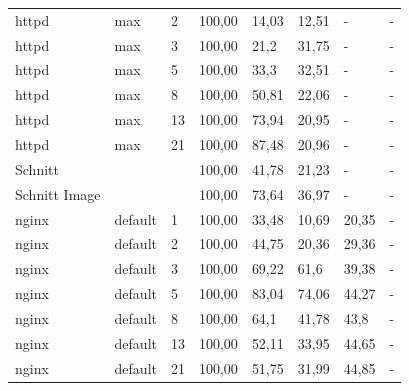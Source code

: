 \begin{footnotesize}
\begin{longtable}{llllllll}
		httpd          & max     & 2          & 100,00 & 14,03                       & 12,51                          & -      & -      \\
		httpd          & max     & 3          & 100,00 & 21,2                        & 31,75                          & -      & -      \\
		httpd          & max     & 5          & 100,00 & 33,3                        & 32,51                          & -      & -      \\
		httpd          & max     & 8          & 100,00 & 50,81                       & 22,06                          & -      & -      \\
		httpd          & max     & 13         & 100,00 & 73,94                       & 20,95                          & -      & -      \\
		httpd          & max     & 21         & 100,00 & 87,48                       & 20,96                          & -      & -      \\ \hline
		Schnitt        &         &            & 100,00 & 41,78                       & 21,23                          & -      & -      \\ \hline
		Schnitt Image  &         &            & 100,00 & 73,64                       & 36,97                          & -      & -      \\ \hline
		nginx          & default & 1          & 100,00 & 33,48                       & 10,69                          & 20,35  & -      \\
		nginx          & default & 2          & 100,00 & 44,75                       & 20,36                          & 29,36  & -      \\
		nginx          & default & 3          & 100,00 & 69,22                       & 61,6                           & 39,38  & -      \\
		nginx          & default & 5          & 100,00 & 83,04                       & 74,06                          & 44,27  & -      \\
		nginx          & default & 8          & 100,00 & 64,1                        & 41,78                          & 43,8   & -      \\
		nginx          & default & 13         & 100,00 & 52,11                       & 33,95                          & 44,65  & -      \\
		nginx          & default & 21         & 100,00 & 51,75                       & 31,99                          & 44,85  & -      \\ \hline

\end{longtable}
\end{footnotesize}

